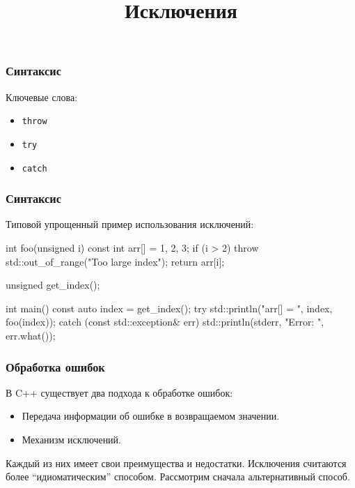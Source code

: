 \documentclass[compress, 8pt, aspectratio=169]{beamer}
\title{Исключения}
\begin{document}
  \frame[plain]{\titlepage}

  \begin{frame}[fragile]

    \frametitle{Синтаксис}

    Ключевые слова:

    \begin{itemize}
      \item \texttt{throw}
      \item \texttt{try}
      \item \texttt{catch}
    \end{itemize}

  \end{frame}

  \begin{frame}[fragile]

    \frametitle{Синтаксис}

    Типовой упрощенный пример использования исключений:

    \begin{myinplacelisting}[minted language=cpp]
int foo(unsigned i) {
    const int arr[] = {1, 2, 3};
    if (i > 2) {
        throw std::out_of_range("Too large index");
    }
    return arr[i];
}

unsigned get_index();

int main() {
    const auto index = get_index();
    try {
        std::println("arr[{}] = {}", index, foo(index));
    }
    catch (const std::exception& err) {
        std::println(stderr, "Error: {}", err.what());
    }
}
    \end{myinplacelisting}

  \end{frame}

  \begin{frame}[fragile]

    \frametitle{Обработка ошибок}

    В C++ существует два подхода к обработке ошибок:

    \hfill \break

    \begin{itemize}
      \item Передача информации об ошибке в возвращаемом значении.
      \item Механизм исключений.
    \end{itemize}

    \hfill \break

    Каждый из них имеет свои преимущества и недостатки.
    Исключения считаются более \enquote{идиоматическим} способом.
    Рассмотрим сначала альтернативный способ.

  \end{frame}
\end{document}
